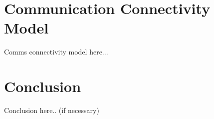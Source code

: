 \documentclass[a4paper,10pt]{article}
\begin{document}
\section{Communication Connectivity Model}
Comms connectivity model here...
\section{Conclusion}
Conclusion here.. (if necessary)

\end{document}
